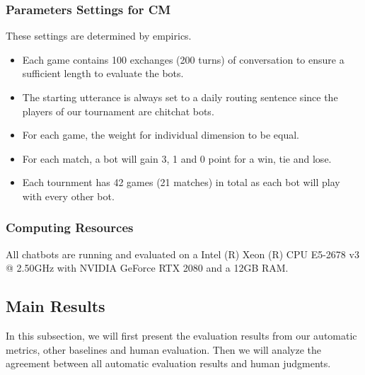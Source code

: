 \subsubsection*{Parameters Settings for CM}
These settings are determined by empirics.
\begin{itemize}
\item  Each game contains 100 exchanges (200 turns) of conversation
to ensure a sufficient length to evaluate the bots.
\item  The starting utterance is always set to
a daily routing sentence
since the players of our tournament are chitchat bots.
\item For each game, the weight for individual dimension to be equal. 
\item For each match, a bot will gain 3, 1 and 0 point for a win, tie and lose.
\item Each tournment has 42 games (21 matches) 
in total as each bot will play with every other bot. 
\end{itemize}

\subsubsection*{Computing Resources}
All chatbots are running and evaluated on a Intel (R) Xeon (R) CPU 
E5-2678 v3 @ 2.50GHz with NVIDIA GeForce RTX 2080 and a 12GB RAM. 

\subsection{Main Results }
\label{sec:main}
In this subsection, we will first present the evaluation results from our automatic metrics, other baselines and human evaluation. 
Then we will analyze the agreement between all automatic evaluation results and human judgments.  

